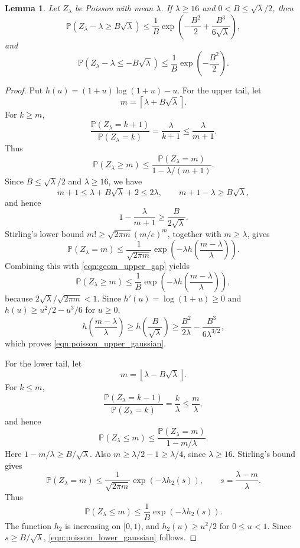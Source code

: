 \documentclass[12pt,a4paper,reqno]{amsart}
\theoremstyle{plain}
\newtheorem{lmm}[thrm]{Lemma}
\numberwithin{sblmm}{thrm}
\numberwithin{equation}{section}
\begin{document}
\begin{lmm}\label{lem:poisson_mills}
    Let $Z_{\lambda}$ be Poisson with mean $\lambda$. If $\lambda\ge 16$ and $0<B\le\sqrt{\lambda}/2$, then
    \begin{equation}\label{eqn:poisson_upper_gaussian}
        \mathbb{P}(Z_{\lambda}-\lambda\ge B\sqrt{\lambda})\le\frac{1}{B}\exp\left(-\frac{B^2}{2}+\frac{B^3}{6\sqrt{\lambda}}\right),
    \end{equation}
    and
    \begin{equation}\label{eqn:poisson_lower_gaussian}
        \mathbb{P}(Z_{\lambda}-\lambda\le -B\sqrt{\lambda})\le\frac{1}{B}\exp\left(-\frac{B^2}{2}\right).
    \end{equation}
\end{lmm}
\begin{proof}
    Put $h(u)=(1+u)\log(1+u)-u$. For the upper tail, let
    $$m=\left\lceil \lambda+B\sqrt{\lambda}\right\rceil.$$
    For $k\ge m$,
    $$\frac{\mathbb{P}(Z_{\lambda}=k+1)}{\mathbb{P}(Z_{\lambda}=k)}=\frac{\lambda}{k+1}\le\frac{\lambda}{m+1}.$$
    Thus
    $$\mathbb{P}(Z_{\lambda}\ge m)\le\frac{\mathbb{P}(Z_{\lambda}=m)}{1-\lambda/(m+1)}.$$
    Since $B\le\sqrt{\lambda}/2$ and $\lambda\ge 16$, we have
    $$m+1\le\lambda+B\sqrt{\lambda}+2\le 2\lambda,\qquad m+1-\lambda\ge B\sqrt{\lambda},$$
    and hence
    \begin{equation}\label{eqn:geom_upper_gap}
        1-\frac{\lambda}{m+1}\ge\frac{B}{2\sqrt{\lambda}}.
    \end{equation}
    Stirling's lower bound $m!\ge\sqrt{2\pi m}(m/e)^m$, together with $m\ge\lambda$, gives
    $$\mathbb{P}(Z_{\lambda}=m)\le\frac{1}{\sqrt{2\pi m}}\exp\left(-\lambda h\left(\frac{m-\lambda}{\lambda}\right)\right).$$
    Combining this with \eqref{eqn:geom_upper_gap} yields
    $$\mathbb{P}(Z_{\lambda}\ge m)\le\frac{1}{B}\exp\left(-\lambda h\left(\frac{m-\lambda}{\lambda}\right)\right),$$
    because $2\sqrt{\lambda}/\sqrt{2\pi m}<1$. Since $h'(u)=\log(1+u)\ge 0$ and $h(u)\ge u^2/2-u^3/6$ for $u\ge 0$,
    $$h\left(\frac{m-\lambda}{\lambda}\right)\ge h\left(\frac{B}{\sqrt{\lambda}}\right)\ge\frac{B^2}{2\lambda}-\frac{B^3}{6\lambda^{3/2}},$$
    which proves \eqref{eqn:poisson_upper_gaussian}.

    For the lower tail, let
    $$m=\left\lfloor \lambda-B\sqrt{\lambda}\right\rfloor.$$
    For $k\le m$,
    $$\frac{\mathbb{P}(Z_{\lambda}=k-1)}{\mathbb{P}(Z_{\lambda}=k)}=\frac{k}{\lambda}\le\frac{m}{\lambda},$$
    and hence
    $$\mathbb{P}(Z_{\lambda}\le m)\le\frac{\mathbb{P}(Z_{\lambda}=m)}{1-m/\lambda}.$$
    Here $1-m/\lambda\ge B/\sqrt{\lambda}$. Also $m\ge\lambda/2-1\ge\lambda/4$, since $\lambda\ge 16$. Stirling's bound gives
    $$\mathbb{P}(Z_{\lambda}=m)\le\frac{1}{\sqrt{2\pi m}}\exp(-\lambda h_2(s)),\qquad s=\frac{\lambda-m}{\lambda}.$$
    Thus
    $$\mathbb{P}(Z_{\lambda}\le m)\le\frac{1}{B}\exp(-\lambda h_2(s)).$$
    The function $h_2$ is increasing on $[0,1)$, and $h_2(u)\ge u^2/2$ for $0\le u<1$. Since $s\ge B/\sqrt{\lambda}$, \eqref{eqn:poisson_lower_gaussian} follows.
\end{proof}
\end{document}
